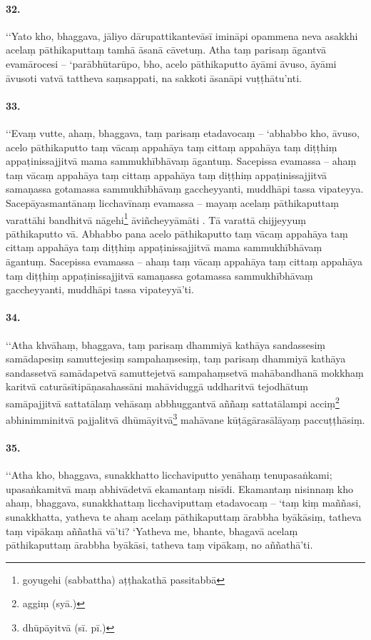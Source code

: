\paragraph{32.} ‘‘Yato kho, bhaggava, jāliyo dārupattikantevāsī imināpi opammena neva asakkhi acelaṃ pāthikaputtaṃ tamhā āsanā cāvetuṃ. Atha taṃ parisaṃ āgantvā evamārocesi – ‘parābhūtarūpo, bho, acelo pāthikaputto āyāmi āvuso, āyāmi āvusoti vatvā tattheva saṃsappati, na sakkoti āsanāpi vuṭṭhātu’nti.

\paragraph{33.} ‘‘Evaṃ vutte, ahaṃ, bhaggava, taṃ parisaṃ etadavocaṃ – ‘abhabbo kho, āvuso, acelo pāthikaputto taṃ vācaṃ appahāya taṃ cittaṃ appahāya taṃ diṭṭhiṃ appaṭinissajjitvā mama sammukhībhāvaṃ āgantuṃ. Sacepissa evamassa – ahaṃ taṃ vācaṃ appahāya taṃ cittaṃ appahāya taṃ diṭṭhiṃ appaṭinissajjitvā samaṇassa gotamassa sammukhībhāvaṃ gaccheyyanti, muddhāpi tassa vipateyya. Sacepāyasmantānaṃ licchavīnaṃ evamassa – mayaṃ acelaṃ pāthikaputtaṃ varattāhi bandhitvā nāgehi\footnote{goyugehi (sabbattha) aṭṭhakathā passitabbā} āviñcheyyāmāti . Tā varattā chijjeyyuṃ pāthikaputto vā. Abhabbo pana acelo pāthikaputto taṃ vācaṃ appahāya taṃ cittaṃ appahāya taṃ diṭṭhiṃ appaṭinissajjitvā mama sammukhībhāvaṃ āgantuṃ. Sacepissa evamassa – ahaṃ taṃ vācaṃ appahāya taṃ cittaṃ appahāya taṃ diṭṭhiṃ appaṭinissajjitvā samaṇassa gotamassa sammukhībhāvaṃ gaccheyyanti, muddhāpi tassa vipateyyā’ti.

\paragraph{34.} ‘‘Atha khvāhaṃ, bhaggava, taṃ parisaṃ dhammiyā kathāya sandassesiṃ samādapesiṃ samuttejesiṃ sampahaṃsesiṃ, taṃ parisaṃ dhammiyā kathāya sandassetvā samādapetvā samuttejetvā sampahaṃsetvā mahābandhanā mokkhaṃ karitvā caturāsītipāṇasahassāni mahāviduggā uddharitvā tejodhātuṃ samāpajjitvā sattatālaṃ vehāsaṃ abbhuggantvā aññaṃ sattatālampi acciṃ\footnote{aggiṃ (syā.)} abhinimminitvā pajjalitvā dhūmāyitvā\footnote{dhūpāyitvā (sī. pī.)} mahāvane kūṭāgārasālāyaṃ paccuṭṭhāsiṃ.

\paragraph{35.} ‘‘Atha kho, bhaggava, sunakkhatto licchaviputto yenāhaṃ tenupasaṅkami; upasaṅkamitvā maṃ abhivādetvā ekamantaṃ nisīdi. Ekamantaṃ nisinnaṃ kho ahaṃ, bhaggava, sunakkhattaṃ licchaviputtaṃ etadavocaṃ – ‘taṃ kiṃ maññasi, sunakkhatta, yatheva te ahaṃ acelaṃ pāthikaputtaṃ ārabbha byākāsiṃ, tatheva taṃ vipākaṃ aññathā vā’ti? ‘Yatheva me, bhante, bhagavā acelaṃ pāthikaputtaṃ ārabbha byākāsi, tatheva taṃ vipākaṃ, no aññathā’ti.


